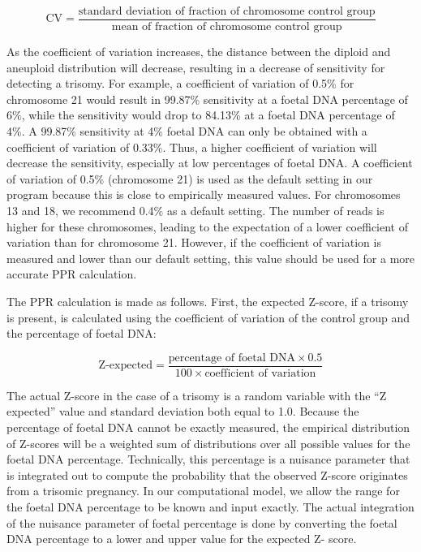\begin{equation*}
	\textrm{CV} = \frac{\textrm{standard deviation of fraction of chromosome control group}}{\textrm{mean of fraction of chromosome control group}}
\end{equation*}
\vspace{1mm}

As the coefficient of variation increases, the distance between the diploid and aneuploid distribution will decrease, resulting in a decrease of sensitivity for detecting a trisomy. 
For example, a coefficient of variation of 0.5\% for chromosome 21 would result in 99.87\% sensitivity at a foetal DNA percentage of 6\%, while the sensitivity would drop to 84.13\% at a foetal DNA percentage of 4\%. 
A 99.87\% sensitivity at 4\% foetal DNA can only be obtained with a coefficient of variation of 0.33\%. 
Thus, a higher coefficient of variation will decrease the sensitivity, especially at low percentages of foetal DNA. A coefficient of variation of 0.5\% (chromosome 21) is used as the default setting in our program because this is close to empirically measured values. 
For chromosomes 13 and 18, we recommend 0.4\% as a default setting. 
The number of reads is higher for these chromosomes, leading to the expectation of a lower coefficient of variation than for chromosome 21. 
However, if the coefficient of variation is measured and lower than our default setting, this value should be used for a more accurate PPR calculation.

The PPR calculation is made as follows. 
First, the expected Z-score, if a trisomy is present, is calculated using the coefficient of variation of the control group and the percentage of foetal DNA:

\vspace{1mm}
\begin{equation*}
	\textrm{Z-expected} = \frac{\textrm{percentage of foetal DNA} \times 0.5}{100 \times \textrm{coefficient of variation}}
\end{equation*}
\vspace{1mm}

The actual Z-score in the case of a trisomy is a random variable with the “Z expected” value and standard deviation both equal to 1.0. 
Because the percentage of foetal DNA cannot be exactly measured, the empirical distribution of Z-scores will be a weighted sum of distributions over all possible values for the foetal DNA percentage. 
Technically, this percentage is a nuisance parameter that is integrated out to compute the probability that the observed Z-score originates from a trisomic pregnancy. 
In our computational model, we allow the range for the foetal DNA percentage to be known and input exactly. 
The actual integration of the nuisance parameter of foetal percentage is done by converting the foetal DNA percentage to a lower and upper value for the expected Z- score.

